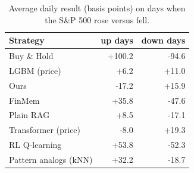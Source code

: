\begin{table}[H]
\centering
\small
\caption{Average daily result (basis points) on days when the S\&P 500 rose versus fell.}
\label{tab:ext-regimes}
\begin{tabular}{lrr}
\toprule
Strategy & up days & down days \\
\midrule
Buy \& Hold & +100.2 & -94.6 \\
LGBM (price) & +6.2 & +11.0 \\
Ours & -17.2 & +15.9 \\
FinMem & +35.8 & -47.6 \\
Plain RAG & +8.5 & -17.1 \\
Transformer (price) & -8.0 & +19.3 \\
RL Q-learning & +53.8 & -52.3 \\
Pattern analogs (kNN) & +32.2 & -18.7 \\
\bottomrule
\end{tabular}
\end{table}
